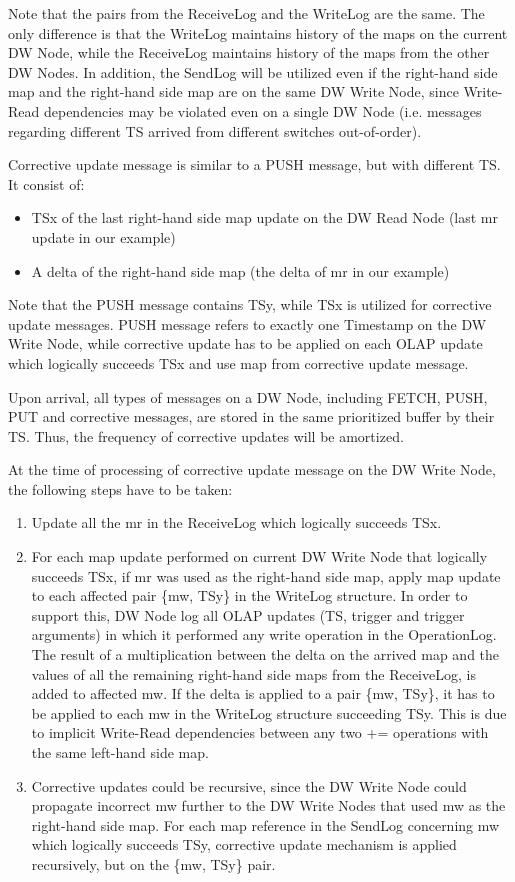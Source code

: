 \documentclass{sig-semester}
\def\OLAP{OLAP\xspace}
\begin{document}
Note that the pairs from the ReceiveLog and the WriteLog are the same. The only difference is that the WriteLog maintains history of the maps on the current DW Node, while the ReceiveLog maintains history of the maps from the other DW Nodes. In addition, the SendLog will be utilized even if the right-hand side map and the right-hand side map are on the same DW Write Node, since Write-Read dependencies may be violated even on a single DW Node (i.e. messages regarding different TS arrived from different switches out-of-order).

Corrective update message is similar to a PUSH message, but with different TS. It consist of:
\begin{itemize}
 \item TSx of the last right-hand side map update on the DW Read Node (last mr update in our example)
 \item A delta of the right-hand side map (the delta of mr in our example)
\end{itemize}

Note that the PUSH message contains TSy, while TSx is utilized for corrective update messages. PUSH message refers to exactly one Timestamp on the DW Write Node, while corrective update has to be applied on each \OLAP update which logically succeeds TSx and use map from corrective update message.

Upon arrival, all types of messages on a DW Node, including FETCH, PUSH, PUT and corrective messages, are stored in the same prioritized buffer by their TS. Thus, the frequency of corrective updates will be amortized.

At the time of processing of corrective update message on the DW Write Node, the following steps have to be taken:
\begin{enumerate}[(1)]
 \item Update all the mr in the ReceiveLog which logically succeeds TSx.

 \item For each map update performed on current DW Write Node that logically succeeds TSx, if mr was used as the right-hand side map, apply map update to each affected pair \{mw, TSy\} in the WriteLog structure. In order to support this, DW Node log all \OLAP updates (TS, trigger and trigger arguments) in which it performed any write operation in the {OperationLog}. The result of a multiplication between the delta on the arrived map and the values of all the remaining right-hand side maps from the ReceiveLog, is added to affected mw. If the delta is applied to a pair \{mw, TSy\}, it has to be applied to each mw in the WriteLog structure succeeding TSy. This is due to implicit Write-Read dependencies between any two += operations with the same left-hand side map.

 \item Corrective updates could be recursive, since the DW Write Node could propagate incorrect mw further to the DW Write Nodes that used mw as the right-hand side map. For each map reference in the SendLog concerning mw which logically succeeds TSy, corrective update mechanism is applied recursively, but on the \{mw, TSy\} pair.
\end{enumerate}
\end{document}
